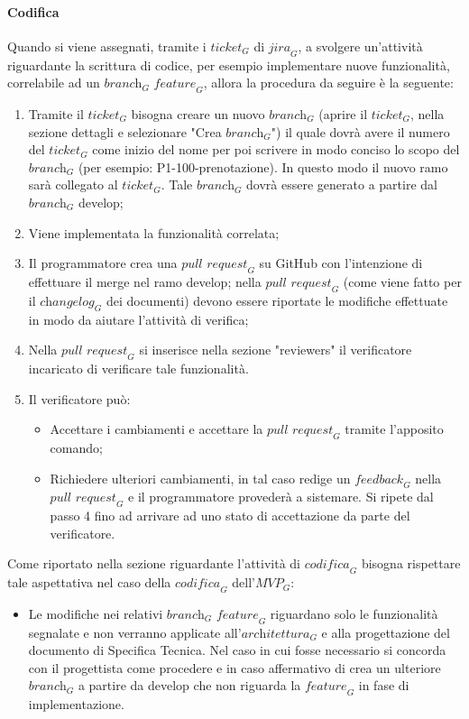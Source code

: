 \paragraph{Codifica}
Quando si viene assegnati, tramite i $\textit{ticket}_G$ di $\textit{jira}_G$, a svolgere un'attività riguardante la scrittura di codice, per esempio implementare nuove funzionalità, correlabile ad un $\textit{branch}_G$ $\textit{feature}_G$, allora la procedura da seguire è la seguente:
\begin{enumerate}
    \item Tramite il $\textit{ticket}_G$ bisogna creare un nuovo $\textit{branch}_G$ (aprire il $\textit{ticket}_G$, nella sezione dettagli e selezionare "Crea $\textit{branch}_G$") il quale dovrà avere il numero del $\textit{ticket}_G$ come inizio del nome per poi scrivere in modo conciso lo scopo del $\textit{branch}_G$ (per esempio: P1-100-prenotazione). In questo modo il nuovo ramo sarà collegato al $\textit{ticket}_G$. Tale $\textit{branch}_G$ dovrà essere generato a partire dal $\textit{branch}_G$ develop;
    \item Viene implementata la funzionalità correlata;
    \item Il programmatore crea una $\textit{pull request}_G$ su GitHub con l'intenzione di effettuare il merge nel ramo develop; nella $\textit{pull request}_G$ (come viene fatto per il $\textit{changelog}_G$ dei documenti) devono essere riportate le modifiche effettuate in modo da aiutare l'attività di verifica;
    \item Nella $\textit{pull request}_G$ si inserisce nella sezione "reviewers" il verificatore incaricato di verificare tale funzionalità.
    \item Il verificatore può: 
    \begin{itemize}
        \item Accettare i cambiamenti e accettare la $\textit{pull request}_G$ tramite l'apposito comando;
        \item Richiedere ulteriori cambiamenti, in tal caso redige un $\textit{feedback}_G$ nella $\textit{pull request}_G$ e il programmatore provederà a sistemare. Si ripete dal passo 4 fino ad arrivare ad uno stato di accettazione da parte del verificatore.
    \end{itemize}
\end{enumerate}
Come riportato nella sezione riguardante l'attività di $\textit{codifica}_G$ bisogna rispettare tale aspettativa nel caso della $\textit{codifica}_G$ dell'$\textit{MVP}_G$:
\begin{itemize}
    \item Le modifiche nei relativi $\textit{branch}_G$ $\textit{feature}_G$ riguardano solo le funzionalità segnalate e non verranno applicate all'$\textit{architettura}_G$ e alla progettazione del documento di Specifica Tecnica. Nel caso in cui fosse necessario si concorda con il progettista come procedere e in caso affermativo di crea un ulteriore $\textit{branch}_G$ a partire da develop che non riguarda la $\textit{feature}_G$ in fase di implementazione.
\end{itemize}
